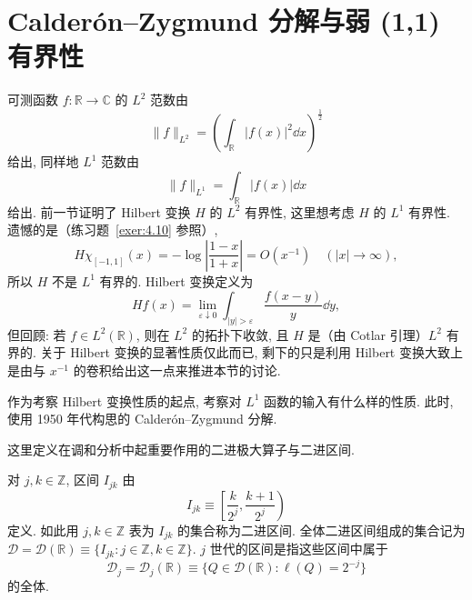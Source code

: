 
\section{Calderón--Zygmund 分解与弱 (1,1) 有界性}\label{sec:4.3}



















可测函数 $f: \mathbb{R} \to \mathbb{C}$ 的 $L^{2}$ 范数由
\[
\|f\|_{L^{2}} = \left(\int_{\mathbb{R}}|f(x)|^{2}\dd x\right)^{\frac{1}{2}}
\]
给出, 同样地 $L^{1}$ 范数由
\[
\|f\|_{L^{1}} = \int_{\mathbb{R}}|f(x)|\dd x
\]
给出. 前一节证明了 Hilbert 变换 $H$ 的 $L^{2}$ 有界性, 这里想考虑 $H$ 的 $L^{1}$ 有界性. 遗憾的是（练习题~\ref{exer:4.10} 参照）,
\[
H\chi_{[-1,1]}(x) = -\log\left|\frac{1-x}{1+x}\right| = O(x^{-1}) \quad (|x| \to \infty),
\]
所以 $H$ 不是 $L^{1}$ 有界的. Hilbert 变换定义为
\[
Hf(x) = \lim_{\varepsilon \downarrow 0}\int_{|y| > \varepsilon}\frac{f(x-y)}{y}\dd y,
\]
但回顾: 若 $f \in L^{2}(\mathbb{R})$, 则在 $L^{2}$ 的拓扑下收敛, 且 $H$ 是（由 Cotlar 引理）$L^{2}$ 有界的. 关于 Hilbert 变换的显著性质仅此而已, 剩下的只是利用 Hilbert 变换大致上是由与 $x^{-1}$ 的卷积给出这一点来推进本节的讨论.

作为考察 Hilbert 变换性质的起点, 考察对 $L^{1}$ 函数的输入有什么样的性质. 此时, 使用 1950 年代构思的 Calderón--Zygmund 分解.

这里定义在调和分析中起重要作用的二进极大算子与二进区间.

\begin{definition}[二进区间]\label{def:4.1}
对 $j, k \in \mathbb{Z}$, 区间 $I_{jk}$ 由
\begin{equation}\tag{4.9}
I_{jk} \equiv \left[\frac{k}{2^{j}}, \frac{k+1}{2^{j}}\right)
\label{eq:4.9}
\end{equation}
定义. 如此用 $j, k \in \mathbb{Z}$ 表为 $I_{jk}$ 的集合称为二进区间. 全体二进区间组成的集合记为 $\mathcal{D} = \mathcal{D}(\mathbb{R}) \equiv \{I_{jk} : j \in \mathbb{Z}, k \in \mathbb{Z}\}$. $j$ 世代的区间是指这些区间中属于
\begin{equation}\tag{4.10}
\mathcal{D}_{j} = \mathcal{D}_{j}(\mathbb{R}) \equiv \{Q \in \mathcal{D}(\mathbb{R}) : \ell(Q) = 2^{-j}\}
\label{eq:4.10}
\end{equation}
的全体.
\end{definition}


